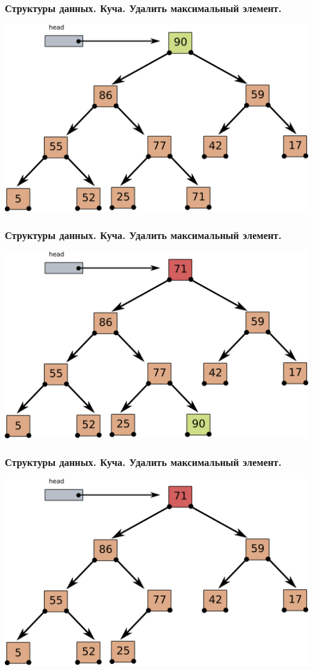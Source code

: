 \documentclass[10pt]{beamer}
\begin{document}
\begin{frame}[fragile]
\frametitle{Структуры данных. Куча. Удалить максимальный элемент.} 
\begin{center}
\includegraphics[width=0.95\linewidth]{images/heap_pop_max_1.png}
\end{center}
\end{frame}
\begin{frame}[fragile]
\frametitle{Структуры данных. Куча. Удалить максимальный элемент.} 
\begin{center}
\includegraphics[width=0.95\linewidth]{images/heap_pop_max_2.png}
\end{center}
\end{frame}
\begin{frame}[fragile]
\frametitle{Структуры данных. Куча. Удалить максимальный элемент.} 
\begin{center}
\includegraphics[width=0.95\linewidth]{images/heap_pop_max_3.png}
\end{center}
\end{frame}
\end{document}
